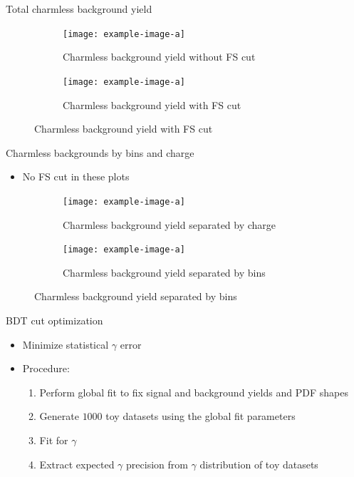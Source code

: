 \documentclass{beamer}
\begin{document}
\begin{frame}{Total charmless background yield}
  \begin{figure}
    \centering
    \vspace{-0.2cm}
    \begin{subfigure}{0.5\textwidth}
      \texttt{[image: example-image-a]}
      \caption{Charmless background yield without FS cut}
    \end{subfigure}%
    \begin{subfigure}{0.5\textwidth}
      \texttt{[image: example-image-a]}
      \caption{Charmless background yield with FS cut}
    \end{subfigure}
  \end{figure}
\end{frame}

\begin{frame}{Charmless backgrounds by bins and charge}
  \begin{itemize}
    \item{No FS cut in these plots}
  \end{itemize}
  \begin{figure}
    \centering
    \vspace{-0.2cm}
    \begin{subfigure}{0.5\textwidth}
      \texttt{[image: example-image-a]}
      \caption{Charmless background yield separated by charge}
    \end{subfigure}%
    \begin{subfigure}{0.5\textwidth}
      \texttt{[image: example-image-a]}
      \caption{Charmless background yield separated by bins}
    \end{subfigure}
  \end{figure}
\end{frame}

\begin{frame}{BDT cut optimization}
  \begin{itemize}
    \setlength\itemsep{1.5em}
    \item{Minimize statistical $\gamma$ error}
    \item{Procedure:}
    \begin{enumerate}
      \item{Perform global fit to fix signal and background yields and PDF shapes}
      \item{Generate $1000$ toy datasets using the global fit parameters}
      \item{Fit for $\gamma$}
      \item{Extract expected $\gamma$ precision from $\gamma$ distribution of toy datasets}
    \end{enumerate}
  \end{itemize}
\end{frame}
\end{document}
